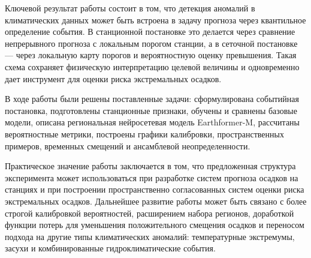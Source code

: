 Ключевой результат работы состоит в том, что детекция аномалий в климатических данных может быть встроена в задачу прогноза через квантильное определение события. В станционной постановке это делается через сравнение непрерывного прогноза с локальным порогом станции, а в сеточной постановке — через локальную карту порогов и вероятностную оценку превышения. Такая схема сохраняет физическую интерпретацию целевой величины и одновременно дает инструмент для оценки риска экстремальных осадков.

В ходе работы были решены поставленные задачи: сформулирована событийная постановка, подготовлены станционные признаки, обучены и сравнены базовые модели, описана региональная нейросетевая модель Earthformer-M, рассчитаны вероятностные метрики, построены графики калибровки, пространственных примеров, временных смещений и ансамблевой неопределенности.

Практическое значение работы заключается в том, что предложенная структура эксперимента может использоваться при разработке систем прогноза осадков на станциях и при построении пространственно согласованных систем оценки риска экстремальных осадков. Дальнейшее развитие работы может быть связано с более строгой калибровкой вероятностей, расширением набора регионов, доработкой функции потерь для уменьшения положительного смещения осадков и переносом подхода на другие типы климатических аномалий: температурные экстремумы, засухи и комбинированные гидроклиматические события.
